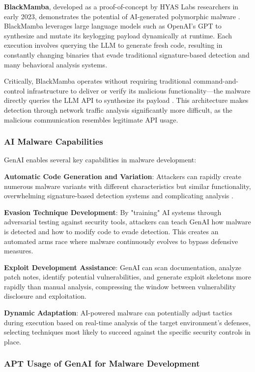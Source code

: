 \textbf{BlackMamba}, developed as a proof-of-concept by HYAS Labs researchers in early 2023, demonstrates the potential of AI-generated polymorphic malware \cite{hyas2023}. BlackMamba leverages large language models such as OpenAI's GPT to synthesize and mutate its keylogging payload dynamically at runtime. Each execution involves querying the LLM to generate fresh code, resulting in constantly changing binaries that evade traditional signature-based detection and many behavioral analysis systems.

Critically, BlackMamba operates without requiring traditional command-and-control infrastructure to deliver or verify its malicious functionality—the malware directly queries the LLM API to synthesize its payload \cite{hyas2023}. This architecture makes detection through network traffic analysis significantly more difficult, as the malicious communication resembles legitimate API usage.

\subsubsection{AI Malware Capabilities}

GenAI enables several key capabilities in malware development:

\textbf{Automatic Code Generation and Variation}: Attackers can rapidly create numerous malware variants with different characteristics but similar functionality, overwhelming signature-based detection systems and complicating analysis \cite{barracuda2024}.

\textbf{Evasion Technique Development}: By "training" AI systems through adversarial testing against security tools, attackers can teach GenAI how malware is detected and how to modify code to evade detection. This creates an automated arms race where malware continuously evolves to bypass defensive measures.

\textbf{Exploit Development Assistance}: GenAI can scan documentation, analyze patch notes, identify potential vulnerabilities, and generate exploit skeletons more rapidly than manual analysis, compressing the window between vulnerability disclosure and exploitation.

\textbf{Dynamic Adaptation}: AI-powered malware can potentially adjust tactics during execution based on real-time analysis of the target environment's defenses, selecting techniques most likely to succeed against the specific security controls in place.

\subsubsection{APT Usage of GenAI for Malware Development}

